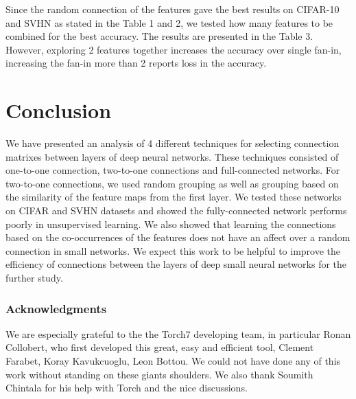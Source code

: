 \documentclass{article} %
\begin{document}
Since the random connection of the features gave the best results on CIFAR-10 and SVHN as stated in the Table 1 and 2, 
we tested how many features to be combined for the best accuracy. The results are presented in the Table 3. 
However, exploring 2 features together increases the accuracy over single fan-in, increasing the fan-in more than 2 
reports loss in the accuracy.


\section{Conclusion}
\label{sec-conc}

We have presented an analysis of 4 different techniques for selecting connection matrixes between layers of deep neural networks.
These techniques consisted of one-to-one connection, two-to-one connections and full-connected networks.
For two-to-one connections, we used random grouping as well as grouping based on the similarity of the feature maps from the first layer. 
We tested these networks on CIFAR and SVHN datasets and showed the fully-connected network performs poorly in unsupervised learning.
We also showed that learning the connections based on the co-occurrences of  the features does not have an affect over a random connection in small networks.
We expect this work to be helpful to improve the efficiency of connections between the layers of deep small neural networks for the further study.


\subsubsection*{Acknowledgments}
We are especially grateful to the the Torch7 developing team, in particular Ronan Collobert, who first developed this great, easy and efficient tool,
Clement Farabet, Koray Kavukcuoglu, Leon Bottou.
We could not have done any of this work without standing on these giants shoulders.
We also thank Soumith Chintala for his help with Torch and the nice discussions.



\end{document}

